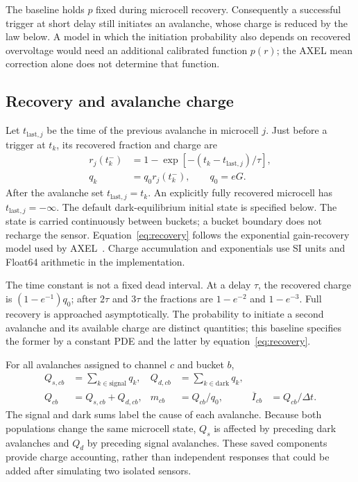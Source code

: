 \documentclass[11pt]{article}
\begin{document}
The baseline holds $p$ fixed during microcell recovery. Consequently a
successful trigger at short delay still initiates an avalanche, whose charge
is reduced by the law below. A model in which the initiation probability also
depends on recovered overvoltage would need an additional calibrated function
$p(r)$; the AXEL mean correction alone does not determine that function.

\subsection{Recovery and avalanche charge}
Let $t_{\mathrm{last},j}$ be the time of the previous avalanche in microcell
$j$. Just before a trigger at $t_k$, its recovered fraction and charge are
\begin{align}
 r_j(t_k^-)&=1-\exp[-(t_k-t_{\mathrm{last},j})/\tau],\\
 q_k&=q_0 r_j(t_k^-),\qquad q_0=eG.
 \label{eq:recovery}
\end{align}
After the avalanche set $t_{\mathrm{last},j}=t_k$. An explicitly fully recovered
microcell has $t_{\mathrm{last},j}=-\infty$. The default dark-equilibrium
initial state is specified below. The state is carried continuously
between buckets; a bucket boundary does not recharge the sensor.
Equation~\eqref{eq:recovery} follows the exponential gain-recovery model used
by AXEL~\cite{Ban2020AXELPrototype}. Charge accumulation and exponentials use
SI units and Float64 arithmetic in the implementation.

The time constant is not a fixed dead interval. At a delay $\tau$, the
recovered charge is $(1-e^{-1})q_0$; after $2\tau$ and $3\tau$ the fractions
are $1-e^{-2}$ and $1-e^{-3}$. Full recovery is approached asymptotically.
The probability to initiate a second avalanche and its available charge are
distinct quantities; this baseline specifies the former by a constant PDE
and the latter by equation~\eqref{eq:recovery}.

For all avalanches assigned to channel $c$ and bucket $b$,
\begin{align}
 Q_{s,cb}&=\sum_{k\in\mathrm{signal}}q_k,&
 Q_{d,cb}&=\sum_{k\in\mathrm{dark}}q_k,\\
 Q_{cb}&=Q_{s,cb}+Q_{d,cb},&
 m_{cb}&=Q_{cb}/q_0,&
 \overline I_{cb}&=Q_{cb}/\Delta t.
 \label{eq:bucket-charge}
\end{align}
The signal and dark sums label the cause of each avalanche. Because both
populations change the same microcell state, $Q_s$ is affected by preceding
dark avalanches and $Q_d$ by preceding signal avalanches. These saved
components provide charge accounting, rather than independent responses that
could be added after simulating two isolated sensors.
\end{document}
